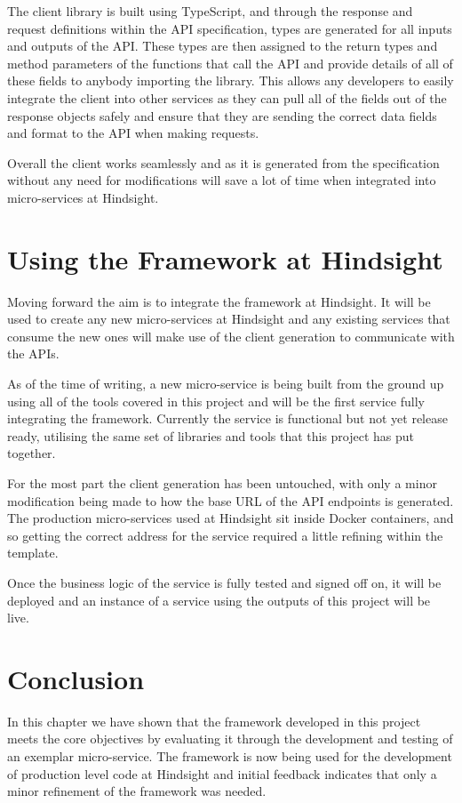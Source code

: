 The client library is built using TypeScript, and through the response and request definitions within the API specification, types are generated for all inputs and outputs of the API. These types are then assigned to the return types and method parameters of the functions that call the API and provide details of all of these fields to anybody importing the library. This allows any developers to easily integrate the client into other services as they can pull all of the fields out of the response objects safely and ensure that they are sending the correct data fields and format to the API when making requests.

Overall the client works seamlessly and as it is generated from the specification without any need for modifications will save a lot of time when integrated into micro-services at Hindsight.
\section{Using the Framework at Hindsight}
Moving forward the aim is to integrate the framework at Hindsight. It will be used to create any new micro-services at Hindsight and any existing services that consume the new ones will make use of the client generation to communicate with the APIs.

As of the time of writing, a new micro-service is being built from the ground up using all of the tools covered in this project and will be the first service fully integrating the framework. Currently the service is functional but not yet release ready, utilising the same set of libraries and tools that this project has put together. 

For the most part the client generation has been untouched, with only a minor modification being made to how the base URL of the API endpoints is generated. The production micro-services used at Hindsight sit inside Docker containers, and so getting the correct address for the service required a little refining within the template. 

Once the business logic of the service is fully tested and signed off on, it will be deployed and an instance of a service using the outputs of this project will be live.

\section{Conclusion}
In this chapter we have shown that the framework developed in this project meets the core objectives by evaluating it through the development and testing of an exemplar micro-service. The framework is now being used for the development of production level code at Hindsight and initial feedback indicates that only a minor refinement of the framework was needed.